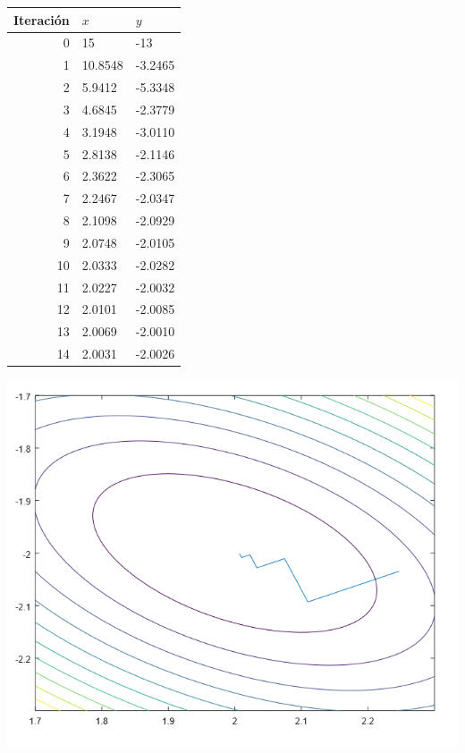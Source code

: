 \begin{table}[h]
    \centering
    \begin{tabular}{r|l|l}
        Iteración & $x$ &    $y$   \\
        \hline
         0  &  15  &  -13 \\
         1  &  10.8548 & -3.2465 \\
         2  &  5.9412 & -5.3348 \\
         3  &  4.6845 & -2.3779 \\
         4  &  3.1948 & -3.0110 \\
         5  &  2.8138 & -2.1146 \\
         6  &  2.3622 & -2.3065 \\
         7  &  2.2467 & -2.0347 \\
         8  &  2.1098 & -2.0929 \\
         9  &  2.0748 & -2.0105 \\
         10  & 2.0333  & -2.0282 \\
         11  & 2.0227  & -2.0032 \\
         12  & 2.0101  & -2.0085 \\
         13  & 2.0069  & -2.0010 \\
         14  & 2.0031  & -2.0026 \\
    \end{tabular}
\end{table}

\begin{center}
    \includegraphics[scale=0.5]{AlfioQuarteroni/Jefferson.png} 
\end{center}


